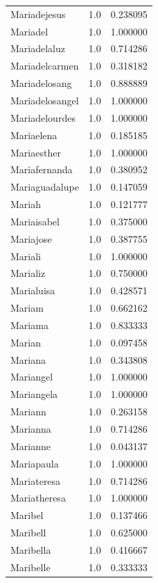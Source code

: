 \documentclass[
  letterpaper,
  DIV=11,
  numbers=noendperiod]{scrreprt}
\begin{document}
\begin{tabular}{lrr}
Mariadejesus    &   1.0 &   0.238095 \\
Mariadel        &   1.0 &   1.000000 \\
Mariadelaluz    &   1.0 &   0.714286 \\
Mariadelcarmen  &   1.0 &   0.318182 \\
Mariadelosang   &   1.0 &   0.888889 \\
Mariadelosangel &   1.0 &   1.000000 \\
Mariadelourdes  &   1.0 &   1.000000 \\
Mariaelena      &   1.0 &   0.185185 \\
Mariaesther     &   1.0 &   1.000000 \\
Mariafernanda   &   1.0 &   0.380952 \\
Mariaguadalupe  &   1.0 &   0.147059 \\
Mariah          &   1.0 &   0.121777 \\
Mariaisabel     &   1.0 &   0.375000 \\
Mariajose       &   1.0 &   0.387755 \\
Mariali         &   1.0 &   1.000000 \\
Marializ        &   1.0 &   0.750000 \\
Marialuisa      &   1.0 &   0.428571 \\
Mariam          &   1.0 &   0.662162 \\
Mariama         &   1.0 &   0.833333 \\
Marian          &   1.0 &   0.097458 \\
Mariana         &   1.0 &   0.343808 \\
Mariangel       &   1.0 &   1.000000 \\
Mariangela      &   1.0 &   1.000000 \\
Mariann         &   1.0 &   0.263158 \\
Marianna        &   1.0 &   0.714286 \\
Marianne        &   1.0 &   0.043137 \\
Mariapaula      &   1.0 &   1.000000 \\
Mariateresa     &   1.0 &   0.714286 \\
Mariatheresa    &   1.0 &   1.000000 \\
Maribel         &   1.0 &   0.137466 \\
Maribell        &   1.0 &   0.625000 \\
Maribella       &   1.0 &   0.416667 \\
Maribelle       &   1.0 &   0.333333 \\

\end{tabular}
\end{document}

